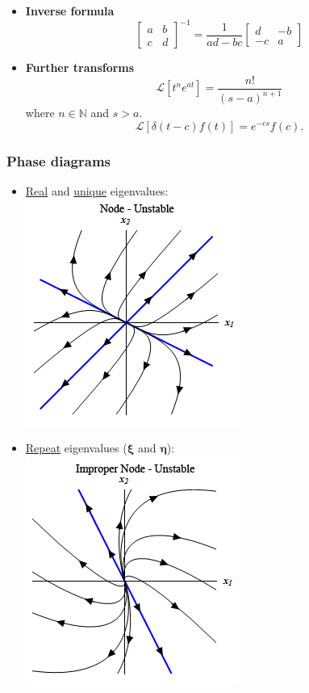 \documentclass{article}
\begin{document}
\begin{multicols*}{3}
\begin{itemize}
        \item \textbf{Inverse formula}
        $$\begin{bmatrix}
            a & b \\
            c & d
        \end{bmatrix}^{-1}
        =\frac{1}{ad-bc}
        \begin{bmatrix}
            d & -b \\
            -c & a
        \end{bmatrix}$$

        \item \textbf{Further transforms} \\
        $$\mathcal{L}[t^n e^{at}]=\frac{n!}{(s-a)^{n+1}}$$
        where $n\in\mathbb{N}$ and $s>a$.
        $$\mathcal{L}
        [\delta(t-c)f(t)]=e^{-cs}f(c).$$
    \end{itemize}

    \columnbreak
    
    \subsubsection*{Phase diagrams}
    \begin{itemize}
        \item \underline{Real} and \underline{unique} eigenvalues: \\
        \includegraphics*[scale=0.5]{f3.png}

        \item \underline{Repeat} eigenvalues
        ($\boldsymbol{\xi}$ and $\boldsymbol{\eta}$): \\
        \includegraphics*[scale=0.5]{f4.png}


\end{itemize}
\end{multicols*}
\end{document}
